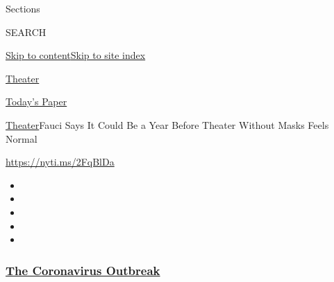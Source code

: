 Sections

SEARCH

\protect\hyperlink{site-content}{Skip to
content}\protect\hyperlink{site-index}{Skip to site index}

\href{https://www.nytimes3xbfgragh.onion/section/theater}{Theater}

\href{https://myaccount.nytimes3xbfgragh.onion/auth/login?response_type=cookie\&client_id=vi}{}

\href{https://www.nytimes3xbfgragh.onion/section/todayspaper}{Today's
Paper}

\href{/section/theater}{Theater}\textbar{}Fauci Says It Could Be a Year
Before Theater Without Masks Feels Normal

\url{https://nyti.ms/2FqBlDa}

\begin{itemize}
\item
\item
\item
\item
\item
\end{itemize}

\hypertarget{the-coronavirus-outbreak}{%
\subsubsection{\texorpdfstring{\href{https://www.nytimes3xbfgragh.onion/news-event/coronavirus?name=styln-coronavirus-national\&region=TOP_BANNER\&block=storyline_menu_recirc\&action=click\&pgtype=Article\&impression_id=30ab99e0-f52c-11ea-82ba-61bb0b8b9915\&variant=undefined}{The
Coronavirus
Outbreak}}{The Coronavirus Outbreak}}\label{the-coronavirus-outbreak}}

